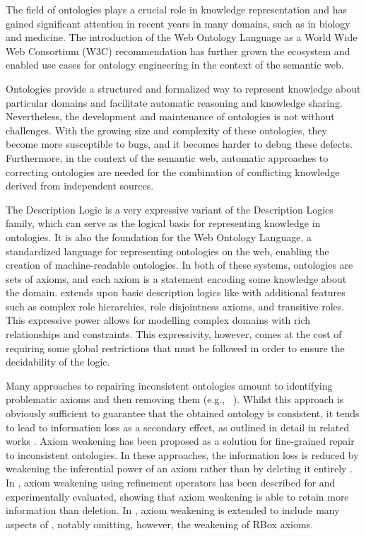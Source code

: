 
The field of ontologies plays a crucial role in knowledge representation and has gained significant attention in recent years in many domains, such as in biology and medicine. The introduction of the Web Ontology Language as a World Wide Web Consortium (W3C) recommendation has further grown the ecosystem and enabled use cases for ontology engineering in the context of the semantic web.

Ontologies provide a structured and formalized way to represent knowledge about particular domains and facilitate automatic reasoning and knowledge sharing. Nevertheless, the development and maintenance of ontologies is not without challenges. With the growing size and complexity of these ontologies, they become more susceptible to bugs, and it becomes harder to debug these defects. Furthermore, in the context of the semantic web, automatic approaches to correcting ontologies are needed for the combination of conflicting knowledge derived from independent sources.

The \SROIQ Description Logic is a very expressive variant of the Description Logics family, which can serve as the logical basis for representing knowledge in ontologies. It is also the foundation for the Web Ontology Language, a standardized language for representing ontologies on the web, enabling the creation of machine-readable ontologies. In both of these systems, ontologies are sets of axioms, and each axiom is a statement encoding some knowledge about the domain. \SROIQ extends upon basic description logics like \ALC with additional features such as complex role hierarchies, role disjointness axioms, and transitive roles. This expressive power allows for modelling complex domains with rich relationships and constraints. This expressivity, however, comes at the cost of requiring some global restrictions that must be followed in order to ensure the decidability of the logic.

Many approaches to repairing inconsistent ontologies amount to identifying problematic axioms and then removing them (e.g., ~\cite{schlobach2003non,kalyanpur2005debugging,kalyanpur2006repairing,BaPS07}). Whilst this approach is obviously sufficient to guarantee that the obtained ontology is consistent, it tends to lead to information loss as a secondary effect, as outlined in detail in related works \cite{troquard2018repairing,confalonieri2020towards}. 
Axiom weakening has been proposed as a solution for fine-grained repair to inconsistent ontologies. In these approaches, the information loss is reduced by weakening the inferential power of an axiom rather than by deleting it entirely \cite{du2014practical,AMAI-2018,baader2018making,troquard2018repairing,confalonieri2020towards}. 
%
In \cite{troquard2018repairing}, axiom weakening using refinement operators has been described for \ALC and experimentally evaluated, showing that axiom weakening is able to retain more information than deletion. In \cite{confalonieri2020towards}, axiom weakening is extended to include many aspects of \SROIQ, notably omitting, however, the weakening of RBox axioms.

